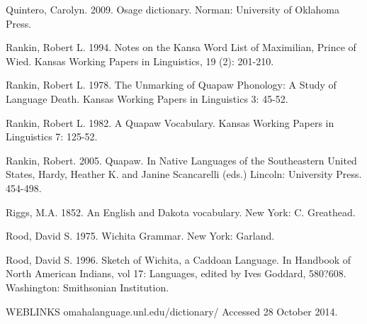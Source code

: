 \documentclass[output=paper]{LSP/langsci}
\begin{document}
\begin{reflist}
Quintero, Carolyn.  2009.  Osage dictionary.  Norman: University of Oklahoma Press.  

Rankin, Robert L. 1994.  Notes on the Kansa Word List of Maximilian, Prince of Wied.  Kansas Working Papers in Linguistics, 19 (2): 201-210.

Rankin, Robert L. 1978. The Unmarking of Quapaw Phonology: A Study of Language Death. Kansas Working Papers in Linguistics 3: 45-52.

Rankin, Robert L. 1982. A Quapaw Vocabulary. Kansas Working Papers in Linguistics 7: 125-52.  

Rankin, Robert. 2005. Quapaw. In Native Languages of the Southeastern United States,  Hardy, Heather K. and Janine Scancarelli (eds.) Lincoln: University Press. 454-498.

Riggs, M.A.  1852.  An English and Dakota vocabulary.  New York: C. Greathead. 

Rood, David S.  1975.  Wichita Grammar.  New York: Garland. 

Rood, David S. 1996. Sketch of Wichita, a Caddoan Language. In Handbook of North American Indians, vol 17: Languages, edited by Ives Goddard, 580?608. Washington: Smithsonian Institution.  

WEBLINKS
omahalanguage.unl.edu/dictionary/  Accessed 28 October 2014.

\end{reflist}
\end{document}

